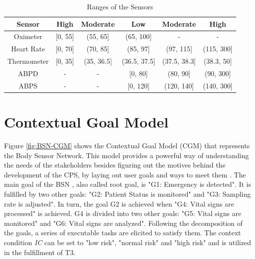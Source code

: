 \begin{table}[!h]
	\centering
	\begin{tabular}{cccccc}
		\hline
		\textbf{Sensor}                  & \textbf{High}                    & \textbf{Moderate}                 & \textbf{Low}                        & \textbf{Moderate}                   & \textbf{High} \\ \hline
		\multicolumn{1}{c|}{Oximeter}    & \multicolumn{1}{c|}{{[}0, 55{]}} & \multicolumn{1}{c|}{(55, 65{]}}   & \multicolumn{1}{c|}{(65, 100{]}}    & \multicolumn{1}{c|}{-}              & -             \\ \hline
		\multicolumn{1}{c|}{Heart Rate}  & \multicolumn{1}{c|}{{[}0, 70{]}} & \multicolumn{1}{c|}{(70, 85{]}}   & \multicolumn{1}{c|}{(85, 97{]}}     & \multicolumn{1}{c|}{(97, 115{]}}    & (115, 300{]}  \\ \hline
		\multicolumn{1}{c|}{Thermometer} & \multicolumn{1}{c|}{{[}0, 35{]}} & \multicolumn{1}{c|}{(35, 36.5{]}} & \multicolumn{1}{c|}{(36.5, 37.5{]}} & \multicolumn{1}{c|}{(37.5, 38.3{]}} & (38.3, 50{]}  \\ \hline
		\multicolumn{1}{c|}{ABPD}        & \multicolumn{1}{c|}{-}           & \multicolumn{1}{c|}{-}            & \multicolumn{1}{c|}{{[}0, 80{]}}    & \multicolumn{1}{c|}{(80, 90{]}}     & (90, 300{]}   \\ \hline
		\multicolumn{1}{c|}{ABPS}        & \multicolumn{1}{c|}{-}           & \multicolumn{1}{c|}{-}            & \multicolumn{1}{c|}{{[}0, 120{]}}   & \multicolumn{1}{c|}{(120, 140{]}}   & (140, 300{]} 
	\end{tabular}
	\label{tab:sensor_ranges}
	\caption{Ranges of the Sensors}
\end{table}

\section{Contextual Goal Model}

Figure \ref{fig:BSN-CGM} shows the Contextual Goal Model (CGM) that represents the Body Sensor Network. This model provides a powerful way of understanding the needs of the stakeholders besides figuring out the motives behind the development of the CPS, by laying out user goals and ways to meet them \cite{ali_goal_based_2010}. The main goal of the BSN \cite{pessoa2017building}, also called root goal, is "G1: Emergency is detected". It is fulfilled by two other goals: "G2: Patient Status is monitored" and "G3: Sampling rate is adjusted". In turn, the goal G2 is achieved when "G4: Vital signs are processed" is achieved. G4 is divided into two other goals: "G5: Vital signs are monitored" and "G6: Vital signs are analyzed". Following the decomposition of the goals, a series of executable tasks are elicited to satisfy them. The context condition \textit{IC} can be set to "low risk", "normal risk" and "high risk" and is utilized in the fulfillment of T3.

